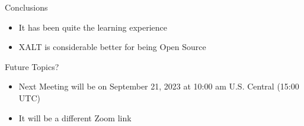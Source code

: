 \documentclass{beamer}
\begin{document}
%
%
%

\begin{frame}{Conclusions}
  \begin{itemize}
    \item It has been quite the learning experience
    \item XALT is considerable better for being Open Source
  \end{itemize}
\end{frame}

\begin{frame}{Future Topics?}
  \begin{itemize}
    \item Next Meeting will be on September 21, 2023 at 10:00 am
      U.S. Central (15:00 UTC)
    \item It will be a different Zoom link
  \end{itemize}
\end{frame}

%
\end{document}
